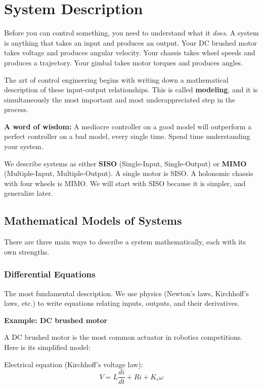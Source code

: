 \section{System Description}

Before you can control something, you need to understand what it \textit{does}. A system is anything that takes an input and produces an output. Your DC brushed motor takes voltage and produces angular velocity. Your chassis takes wheel speeds and produces a trajectory. Your gimbal takes motor torques and produces angles.

The art of control engineering begins with writing down a mathematical description of these input-output relationships. This is called \textbf{modeling}, and it is simultaneously the most important and most underappreciated step in the process.

\textbf{A word of wisdom:} A mediocre controller on a good model will outperform a perfect controller on a bad model, every single time. Spend time understanding your system.

We describe systems as either \textbf{SISO} (Single-Input, Single-Output) or \textbf{MIMO} (Multiple-Input, Multiple-Output). A single motor is SISO. A holonomic chassis with four wheels is MIMO. We will start with SISO because it is simpler, and generalize later.

\subsection{Mathematical Models of Systems}

There are three main ways to describe a system mathematically, each with its own strengths.

\subsubsection{Differential Equations}

The most fundamental description. We use physics (Newton's laws, Kirchhoff's laws, etc.) to write equations relating inputs, outputs, and their derivatives.

\textbf{Example: DC brushed motor}

A DC brushed motor is the most common actuator in robotics competitions. Here is its simplified model:

Electrical equation (Kirchhoff's voltage law):
\begin{equation}
V = L \frac{di}{dt} + Ri + K_e \omega
\end{equation}

